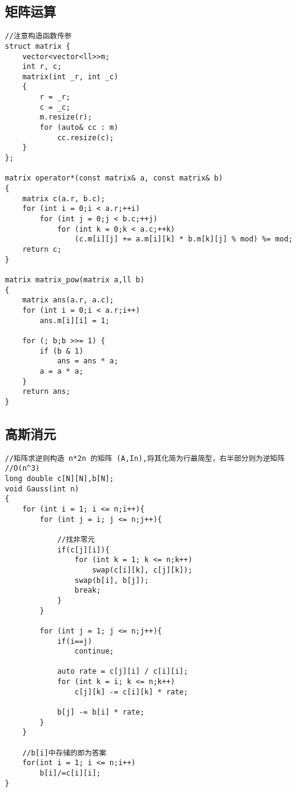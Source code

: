 \documentclass[twocolumn,a4]{article}
\begin{document}
\subsection{矩阵运算}
\begin{lstlisting}
//注意构造函数传参
struct matrix {
    vector<vector<ll>>m;
    int r, c;
    matrix(int _r, int _c)
    {
        r = _r;
        c = _c;
        m.resize(r);
        for (auto& cc : m)
            cc.resize(c);
    }
};

matrix operator*(const matrix& a, const matrix& b)
{
    matrix c(a.r, b.c);
    for (int i = 0;i < a.r;++i)
        for (int j = 0;j < b.c;++j)
            for (int k = 0;k < a.c;++k)
                (c.m[i][j] += a.m[i][k] * b.m[k][j] % mod) %= mod;
    return c;
}

matrix matrix_pow(matrix a,ll b)
{
    matrix ans(a.r, a.c);
    for (int i = 0;i < a.r;i++)
        ans.m[i][i] = 1;

    for (; b;b >>= 1) {
        if (b & 1)
            ans = ans * a;
        a = a * a;
    }
    return ans;
}
\end{lstlisting}

\subsection{高斯消元}
\begin{lstlisting}
//矩阵求逆则构造 n*2n 的矩阵 (A,In),将其化简为行最简型，右半部分则为逆矩阵
//O(n^3)
long double c[N][N],b[N];
void Gauss(int n)
{
    for (int i = 1; i <= n;i++){
        for (int j = i; j <= n;j++){
            
            //找非零元
            if(c[j][i]){
                for (int k = 1; k <= n;k++)
                    swap(c[i][k], c[j][k]);
                swap(b[i], b[j]);
                break;
            }
        }

        for (int j = 1; j <= n;j++){
            if(i==j)
                continue;

            auto rate = c[j][i] / c[i][i];
            for (int k = i; k <= n;k++)
                c[j][k] -= c[i][k] * rate;

            b[j] -= b[i] * rate;
        }
    }
    
    //b[i]中存储的即为答案
    for(int i = 1; i <= n;i++)
        b[i]/=c[i][i];
}
\end{lstlisting}
\end{document}
